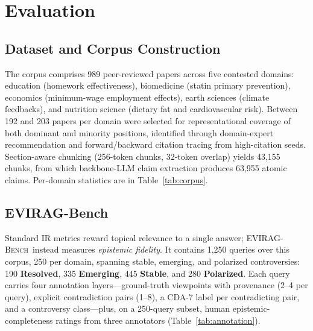 \documentclass[11pt]{article}
\newcommand{\bench}{\textsc{EVIRAG-Bench}\xspace}
\begin{document}
\section{Evaluation}
\label{sec:eval}

\subsection{Dataset and Corpus Construction}
\label{sec:corpus}

The corpus comprises 989 peer-reviewed papers across five contested domains:
education (homework effectiveness), biomedicine (statin primary prevention),
economics (minimum-wage employment effects), earth sciences (climate
feedbacks), and nutrition science (dietary fat and cardiovascular risk).
Between 192 and 203 papers per domain were selected for representational
coverage of both dominant and minority positions, identified through
domain-expert recommendation and forward/backward citation tracing from
high-citation seeds.  Section-aware chunking (256-token chunks, 32-token
overlap) yields 43,155 chunks, from which backbone-LLM claim extraction
produces 63,955 atomic claims.  Per-domain statistics are in
Table~\ref{tab:corpus}.

\subsection{EVIRAG-Bench}\label{sec:bench}

Standard IR metrics reward topical relevance to a single answer; \bench\
instead measures \emph{epistemic fidelity}.  It contains 1,250 queries over
this corpus, 250 per domain, spanning stable, emerging, and polarized
controversies: 190 \textbf{Resolved}, 335 \textbf{Emerging}, 445
\textbf{Stable}, and 280 \textbf{Polarized}.  Each query carries four
annotation layers---ground-truth viewpoints with provenance (2--4 per query),
explicit contradiction pairs (1--8), a CDA-7 label per contradicting pair, and
a controversy class---plus, on a 250-query subset, human epistemic-completeness
ratings from three annotators (Table~\ref{tab:annotation}).
\end{document}
